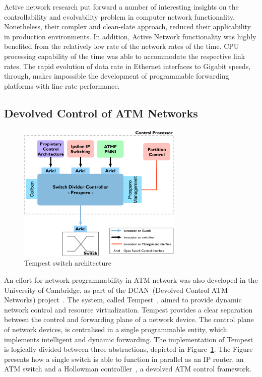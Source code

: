 Active network research put forward a number of interesting insights on the
controllability and evolvability problem in computer network functionality.
Nonetheless, their complex and clean-slate approach, reduced their applicability
in production environments. In addition, Active Network functionality was highly
benefited from the relatively low rate of the network rates of the time. CPU
processing capability of the time was able to accommodate the respective link
rates. The rapid evolution of data rate in Ethernet interfaces to Gigabit
speeds, through, makes impossible the development of programmable forwarding
platforms with line rate performance. 

\subsection{Devolved Control of ATM Networks}

\begin{figure}
  \begin{center}
\includegraphics[width=0.7\textwidth]{tempest_arch}
\caption{Tempest switch architecture~\cite{UCAM-CL-TR-450}}
\label{fig:background:tempest_arch}
\end{center}
\end{figure}

An effort for network programmability in ATM network was also developed in the
University of Cambridge, as part of the DCAN~(Devolved Control ATM Networks)
project~\cite{dcan}.  The system, called Tempest~\cite{Rooney1998}, aimed to
provide dynamic network control and resource virtualization. Tempest provides a
clear separation between the control and forwarding plane of a network device.
The control plane of network devices, is centralised in a single programmable
entity, which implements intelligent and dynamic forwarding.  The implementation
of Tempest is logically divided between three abstractions, depicted in
Figure~\ref{fig:background:tempest_arch}. The Figure presents how a single
switch is able to function in parallel as an IP router, an ATM switch and a
Hollowman controlller~\cite{Rooney1997}, a devolved ATM control framework. 

